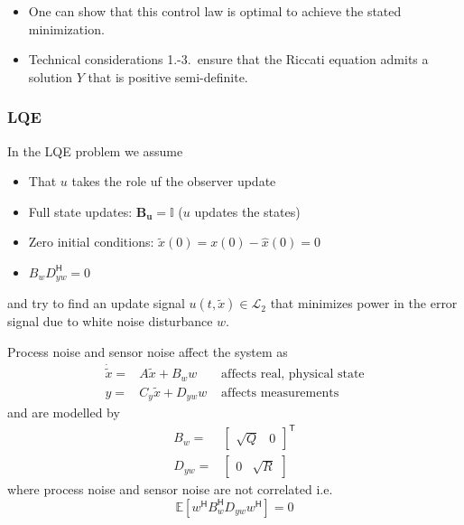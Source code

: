 
\begin{itemize}
    \item One can show that this control law is optimal to achieve the stated minimization.
    \item Technical considerations 1.-3.\ ensure that the Riccati equation admits a solution $Y$ that is positive semi-definite.
\end{itemize}


\subsubsection{LQE}
In the LQE problem we assume
\begin{itemize}
    \item That $u$ takes the role uf the observer update
    \item Full state updates: $\mathbf{B_u}=\mathbf{\mathbb{I}}$ ($u$ updates the states)
    \item Zero initial conditions: $\tilde{x}(0)=x(0)-\hat{x}(0)=0$
    \item $B_w D_{yw}^{\mathsf{H}}=0$
\end{itemize}
and try to find an update signal $u(t,\tilde{x})\in \mathcal{L}_2$ that minimizes power in the error signal due to white noise disturbance $w$.


Process noise and sensor noise affect the system as
\begin{align*}
    \dot{\tilde{x}}= & A\tilde{x}+B_{w} w   & \text{ affects real, physical state} \\
    y=               & C_y\tilde{x}+D_{yw}w & \text{ affects measurements}
\end{align*}
and are modelled by
\begin{align*}
    B_w=    & \begin{bmatrix}\sqrt{Q}&0\end{bmatrix}^{\mathsf{T}} \\
    D_{yw}= & \begin{bmatrix}0&\sqrt{R}\end{bmatrix}
\end{align*}
where process noise and sensor noise are not correlated i.e.
\begin{equation*}
    \mathbb{E}\left[w^{\mathsf{H}} B_w^{\mathsf{H}} D_{yw}w^{\mathsf{H}}\right]=0
\end{equation*}


